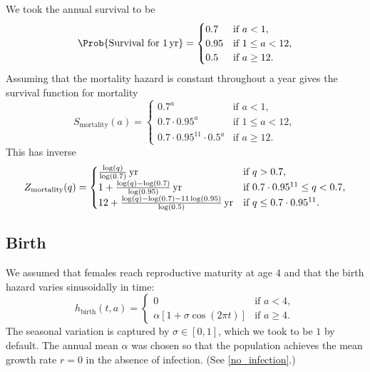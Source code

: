 \documentclass{jpmarticle}
\begin{document}
We took the annual survival to be
\begin{equation}
  \Prob\{\text{Survival for $\unit[1]{yr}$}\}
  =
  \begin{cases}
    0.7 & \text{if $a < 1$},
    \\
    0.95 & \text{if $1 \leq a < 12$},
    \\
    0.5 & \text{if $a \geq 12$}.
  \end{cases}
\end{equation}
Assuming that the mortality hazard is constant throughout a year gives
the survival function for mortality
\begin{equation}
  S_{\text{mortality}}(a) =
  \begin{cases}
    0.7^a & \text{if $a < 1$},
    \\
    0.7 \cdot 0.95^a & \text{if $1 \leq a < 12$},
    \\
    0.7 \cdot 0.95^{11} \cdot 0.5^a & \text{if $a \geq 12$}.
  \end{cases}
\end{equation}
This has inverse
\begin{equation}
  Z_{\text{mortality}}(q) =
  \begin{cases}
    \unit[\frac{\log(q)}{\log(0.7)}]{yr} & \text{if $q > 0.7$},
    \\
    \unit[1 + \frac{\log(q) - \log(0.7)}{\log(0.95)}]{yr}
    & \text{if $0.7 \cdot 0.95^{11} \leq q < 0.7$},
    \\
    \unit[12 + \frac{\log(q) - \log(0.7) - 11 \log(0.95)}{\log(0.5)}]{yr}
    & \text{if $q \leq 0.7 \cdot 0.95^{11}$}.
  \end{cases}
\end{equation}


\subsection{Birth}

We assumed that females reach reproductive maturity at age $4$ and
that the birth hazard varies sinusoidally in time:
\begin{equation}
  h_{\text{birth}}(t, a) =
  \begin{cases}
    0 & \text{if $a < 4$},
    \\
    \alpha \left[1
      + \sigma \cos\left(2 \pi t\right)\right]
    & \text{if $a \geq 4$}.
  \end{cases}
\end{equation}
The seasonal variation is captured by $\sigma \in [0, 1]$, which we
took to be $1$ by default.  The annual mean $\alpha$ was chosen so
that the population achieves the mean growth rate $r = 0$ in the
absence of infection.  (See \autoref{no_infection}.)
\end{document}
